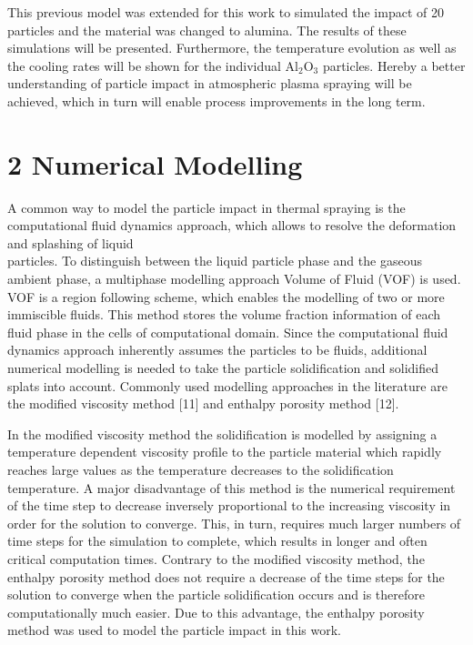 \documentclass[10pt]{article}
\begin{document}
This previous model was extended for this work to simulated the impact of 20 particles and the material was changed to alumina. The results of these simulations will be presented. Furthermore, the temperature evolution as well as the cooling rates will be shown for the individual $\mathrm{Al}_{2} \mathrm{O}_{3}$ particles. Hereby a better understanding of particle impact in atmospheric plasma spraying will be achieved, which in turn will enable process improvements in the long term.

\section*{2 Numerical Modelling}
A common way to model the particle impact in thermal spraying is the computational fluid dynamics approach, which allows to resolve the deformation and splashing of liquid\\
particles. To distinguish between the liquid particle phase and the gaseous ambient phase, a multiphase modelling approach Volume of Fluid (VOF) is used. VOF is a region following scheme, which enables the modelling of two or more immiscible fluids. This method stores the volume fraction information of each fluid phase in the cells of computational domain. Since the computational fluid dynamics approach inherently assumes the particles to be fluids, additional numerical modelling is needed to take the particle solidification and solidified splats into account. Commonly used modelling approaches in the literature are the modified viscosity method [11] and enthalpy porosity method [12].

In the modified viscosity method the solidification is modelled by assigning a temperature dependent viscosity profile to the particle material which rapidly reaches large values as the temperature decreases to the solidification temperature. A major disadvantage of this method is the numerical requirement of the time step to decrease inversely proportional to the increasing viscosity in order for the solution to converge. This, in turn, requires much larger numbers of time steps for the simulation to complete, which results in longer and often critical computation times. Contrary to the modified viscosity method, the enthalpy porosity method does not require a decrease of the time steps for the solution to converge when the particle solidification occurs and is therefore computationally much easier. Due to this advantage, the enthalpy porosity method was used to model the particle impact in this work.
\end{document}
